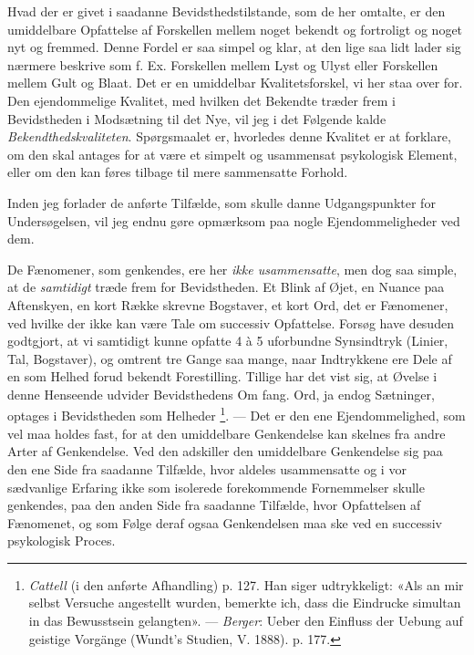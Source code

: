 \documentclass[12pt,a4paper,openany]{book}
\newcommand{\opage}[1]{\marginnote{\footnotesize\textit{[#1]}}}
\begin{document}
Hvad der er givet i saadanne Bevidsthedstilstande, som de her omtalte, er den
umiddelbare Opfattelse af Forskellen mellem noget bekendt og fortroligt og
noget nyt og fremmed. Denne Fordel %
er saa simpel og klar, at den lige saa lidt lader sig nærmere beskrive som f.
Ex. Forskellen mellem Lyst og Ulyst eller Forskellen mellem Gult og Blaat. Det
er en umiddelbar Kvalitetsforskel, vi her staa over for. Den ejendommelige
Kvalitet, med hvilken det Bekendte træder frem i Bevidstheden i Modsætning til
det Nye, vil jeg i det Følgende kalde \emph{Bekendthedskvaliteten}.
Spørgsmaalet er, hvorledes denne Kvalitet er at forklare, om den skal antages
for at være et simpelt og usammensat psykologisk Element, eller om den kan
føres tilbage til mere sammensatte Forhold.

Inden jeg forlader de anførte Tilfælde, som skulle danne Udgangspunkter for
Undersøgelsen, vil jeg endnu gøre opmærksom paa nogle Ejendommeligheder ved dem.

De Fænomener, som genkendes, ere her \emph{ikke usammensatte}, men dog saa
simple, at de \emph{samtidigt} træde frem for Bevidstheden. Et Blink af Øjet,
en Nuance paa Aftenskyen, en kort Række skrevne Bogstaver, et kort Ord, det er
Fænomener, ved hvilke der ikke kan være Tale om successiv Opfattelse. Forsøg
have desuden godtgjort, at vi samtidigt kunne opfatte 4 à 5 uforbundne
Synsindtryk (Linier, Tal, Bogstaver), og omtrent tre Gange saa mange, naar
Indtrykkene ere Dele af en som Helhed forud bekendt Forestilling. Tillige har
det vist sig, at Øvelse i denne Henseende udvider Bevidsthedens Om%
\setcounter{footnote}{0}%
\opage{10}fang. Ord, ja endog Sætninger, optages i Bevidstheden som Helheder%
\footnote[1]{\emph{Cattell} (i den anførte Afhandling) p. 127. Han siger
udtrykkeligt: «Als an mir selbst Versuche angestellt wurden, bemerkte ich, dass
die Eindrucke simultan in das Bewusstsein gelangten». --- \emph{Berger}: Ueber
den Einfluss der Uebung auf geistige Vorgänge (Wundt's Studien, V. 1888). p.
177.}. --- Det er den ene Ejendommelighed, som vel maa holdes fast, for at den
umiddelbare Genkendelse kan skelnes fra andre Arter af Genkendelse. Ved den
adskiller den umiddelbare Genkendelse sig paa den ene Side fra saadanne
Tilfælde, hvor aldeles usammensatte og i vor sædvanlige Erfaring ikke som
isolerede forekommende Fornemmelser skulle genkendes, paa den anden Side fra
saadanne Tilfælde, hvor Opfattelsen af Fænomenet, og som Følge deraf ogsaa
Genkendelsen maa ske ved en successiv psykologisk Proces.
\end{document}
